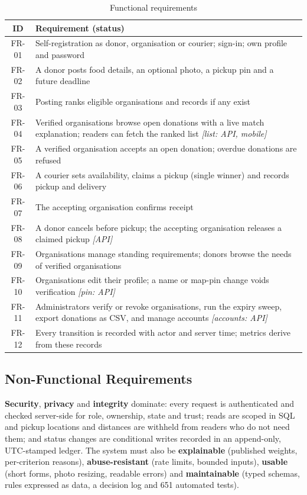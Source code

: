 \begin{table}[!htbp]
\centering
\small
\begin{tabular}{|c|L{12.1cm}|}
  \hline
  \textbf{ID} & \textbf{Requirement (status)} \\
  \hline
  FR-01 & Self-registration as donor, organisation or courier; sign-in; own profile and password \\
  \hline
  FR-02 & A donor posts food details, an optional photo, a pickup pin and a future deadline \\
  \hline
  FR-03 & Posting ranks eligible organisations and records  if any exist \\
  \hline
  FR-04 & Verified organisations browse open donations with a live match explanation; readers can fetch the ranked list \emph{[list: API, mobile]} \\
  \hline
  FR-05 & A verified organisation accepts an open donation; overdue donations are refused \\
  \hline
  FR-06 & A courier sets availability, claims a pickup (single winner) and records pickup and delivery \\
  \hline
  FR-07 & The accepting organisation confirms receipt \\
  \hline
  FR-08 & A donor cancels before pickup; the accepting organisation releases a claimed pickup \emph{[API]} \\
  \hline
  FR-09 & Organisations manage standing requirements; donors browse the needs of verified organisations \\
  \hline
  FR-10 & Organisations edit their profile; a name or map-pin change voids verification \emph{[pin: API]} \\
  \hline
  FR-11 & Administrators verify or revoke organisations, run the expiry sweep, export donations as CSV, and manage accounts \emph{[accounts: API]} \\
  \hline
  FR-12 & Every transition is recorded with actor and server time; metrics derive from these records \\
  \hline
\end{tabular}
\caption{Functional requirements}
\label{tab:fr}
\end{table}

\subsection{Non-Functional Requirements}
\label{sec:nfr}

\textbf{Security}, \textbf{privacy} and \textbf{integrity} dominate: every
request is authenticated and checked server-side for role, ownership, state and
trust; reads are scoped in SQL and pickup locations and distances are withheld
from readers who do not need them; and status changes are conditional writes
recorded in an append-only, UTC-stamped ledger. The system must also be
\textbf{explainable} (published weights, per-criterion reasons),
\textbf{abuse-resistant} (rate limits, bounded inputs), \textbf{usable} (short
forms, photo resizing, readable errors) and \textbf{maintainable} (typed
schemas, rules expressed as data, a decision log and 651 automated tests).

